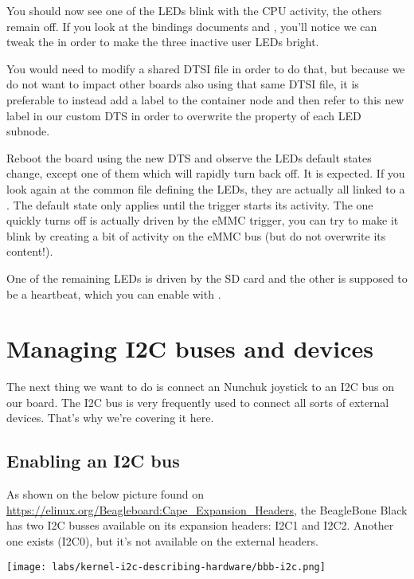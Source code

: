 You should now see one of the LEDs blink with the CPU activity, the
others remain off. If you look at the bindings documents
 and
, you'll
notice we can tweak the  in order to make the
three inactive user LEDs bright.

You would need to modify a shared DTSI file in order to do that, but because we
do not want to impact other boards also using that same DTSI file, it is
preferable to instead add a label to the  container node and then
refer to this new label in our custom DTS in order to overwrite the
 property of each LED subnode.

Reboot the board using the new DTS and observe the LEDs default states
change, except one of them which will rapidly turn back off. It is
expected. If you look again at the common file defining the LEDs, they
are actually all linked to a . The default
state only applies until the trigger starts its activity. The one
quickly turns off is actually driven by the eMMC trigger, you can try to
make it blink by creating a bit of activity on the eMMC bus (but do not
overwrite its content!).

One of the remaining LEDs is driven by the SD card and the other is
supposed to be a heartbeat, which you can enable with
.

\section{Managing I2C buses and devices}

The next thing we want to do is connect an Nunchuk joystick
to an I2C bus on our board. The I2C bus is very frequently used
to connect all sorts of external devices. That's why we're covering
it here.

\subsection{Enabling an I2C bus}

As shown on the below picture found on
\url{https://elinux.org/Beagleboard:Cape_Expansion_Headers}, the
BeagleBone Black has two I2C busses available on its expansion headers:
I2C1 and I2C2. Another one exists (I2C0), but it's not
available on the external headers.

\texttt{[image: labs/kernel-i2c-describing-hardware/bbb-i2c.png]}

